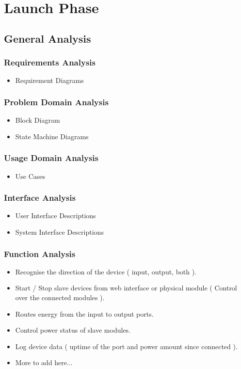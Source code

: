 \section{Launch Phase}
\subsection{General Analysis}
	\subsubsection{Requirements	 Analysis}
		\begin{itemize}
			\item Requirement Diagrams
		\end{itemize}
	\subsubsection{Problem Domain Analysis}
		\begin{itemize}
			\item Block Diagram
			\item State Machine Diagrams
		\end{itemize}
	\subsubsection{Usage Domain Analysis}
		\begin{itemize}
			\item Use Cases
		\end{itemize}
	\subsubsection{Interface Analysis}
		\begin{itemize}
			\item User Interface Descriptions
			\item System Interface Descriptions
		\end{itemize}
	\subsubsection{Function Analysis}
		\begin{itemize}
			\item Recognise the direction of the device ( input, output, both ).
			\item Start / Stop slave devices from web interface or physical module ( Control over the connected modules ).
			\item Routes energy from the input to output ports.
			\item Control power status of slave modules.
			\item Log device data ( uptime of the port and power amount since connected ).
			\item More to add here...
		\end{itemize}
